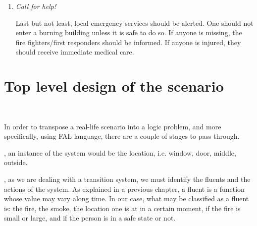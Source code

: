 \documentclass[a4paper,12pt]{report}
\begin{document}
\begin{enumerate}
If clothes catch fire, the flames can spread quickly, engulfing the victim in flames. 
There are three rules which must be followed:
\begin{itemize}
\item {\color{red}{\it Stop}} 

The fire victim must stop still, ceasing any movement which may fan the flames or hamper those attempting to put the fire out.
\item {\color{red}{\it Drop} }

The fire victim must drop to the ground, lying down if possible, covering their face with their hands to avoid facial injury.
\item {\color{red} {\it Roll} }

The  fire victim must roll on the ground in an effort to extinguish the fire  by depriving it of oxygen. If the victim is on a rug or one is nearby,  they can roll the rug around themselves to further extinguish the flame.
\end{itemize}


\item \textit{ Call for help!}

Last but not least, local emergency services should be alerted. 
One should not enter a burning building unless it is safe to do so.
If anyone is missing, the fire fighters/first responders should be informed.
If anyone is injured, they should receive immediate medical care.

\end{enumerate}

\section{Top level design of the scenario}$$
	
	In order to transpose a real-life scenario into a logic problem, and more specifically, using FAL language, there are a couple of stages to pass through.

{\color{blue}{\it Firstly}}, an instance of the system would be the location, i.e. window, door, middle, outside.

{\color{blue}{\it Secondly}}, as we are dealing with a transition system, we must identify the fluents and the actions of the system. 
As explained in a previous chapter, a fluent is a function whose value may vary along time.
In our case, what may be classified as a fluent is: the fire, the smoke, the location one is at in a certain moment, if the fire is small or large, and if the person is in a safe state or not.
\end{document}
